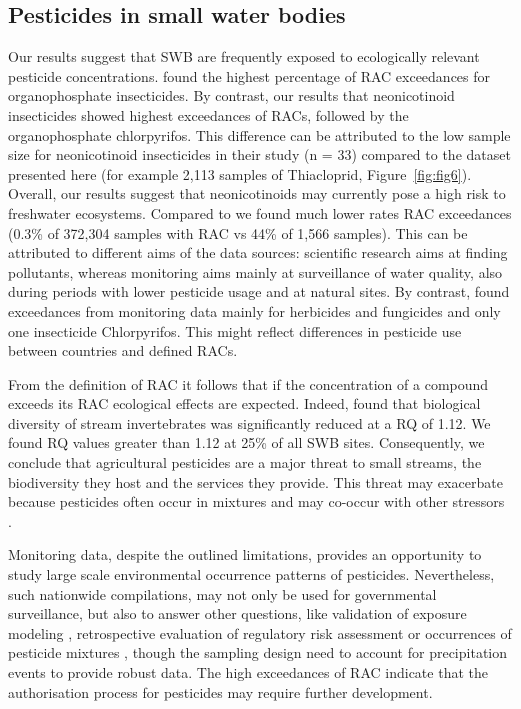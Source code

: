 \documentclass[journal=esthag,manuscript=article]{achemso}
\begin{document}
\subsection{Pesticides in small water bodies}
Our results suggest that SWB are frequently exposed to ecologically relevant pesticide concentrations.
\citet{stehle_pesticide_2015} found the highest percentage of RAC exceedances for organophosphate insecticides. 
By contrast, our results that neonicotinoid insecticides showed highest exceedances of RACs, followed by the organophosphate chlorpyrifos. 
This difference can be attributed to the low sample size for neonicotinoid insecticides in their study (n = 33) compared to the dataset presented here (for example 2,113 samples of Thiacloprid, Figure~\ref{fig:fig6}). 
Overall, our results suggest that neonicotinoids may currently pose a high risk to freshwater ecosystems. 
Compared to \citet{stehle_pesticide_2015} we found much lower rates RAC exceedances (0.3\% of 372,304 samples with RAC vs 44\% of 1,566 samples). 
This can be attributed to different aims of the data sources: scientific research aims at finding pollutants, whereas monitoring aims mainly at surveillance of water quality, also during periods with lower pesticide usage and at natural sites. 
By contrast, \citet{knauer_pesticides_2016} found exceedances from monitoring data mainly for herbicides and fungicides and only one insecticide Chlorpyrifos.
This might reflect differences in pesticide use between countries and defined RACs.

From the definition of RAC it follows that if the concentration of a compound exceeds its RAC ecological effects are expected.
Indeed, \citet{stehle_agricultural_2015} found that biological diversity of stream invertebrates was significantly reduced at a RQ of 1.12.
We found RQ values greater than 1.12 at 25\% of all SWB sites. 
Consequently, we conclude that agricultural pesticides are a major threat to small streams, the biodiversity they host and the services they provide. 
This threat may exacerbate because pesticides often occur in mixtures \cite{schreiner_pesticide_2016} and may co-occur with other stressors \citep{schafer_contribution_2016}.

Monitoring data, despite the outlined limitations, provides an opportunity to study large scale environmental occurrence patterns of pesticides.
Nevertheless, such nationwide compilations, may not only be used for governmental surveillance, but also to answer other questions, like validation of exposure modeling \cite{knabel_fungicide_2014}, retrospective evaluation of regulatory risk assessment \citep{knauer_pesticides_2016,stehle_pesticide_2015}or occurrences of pesticide mixtures \cite{schreiner_pesticide_2016}, though the sampling design need to account for precipitation events to provide robust data. 
The high exceedances of RAC indicate that the authorisation process for pesticides may require further development. 
\end{document}
